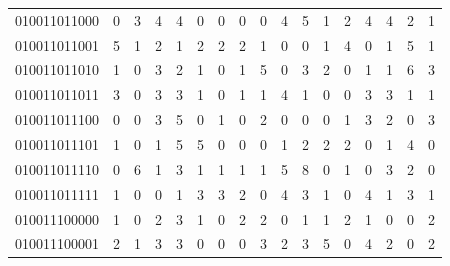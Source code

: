 \documentclass[10pt,a4paper]{article}
\begin{document}
\begin{longtable}{ |c|c|c|c|c|c|c|c|c|c|c|c|c|c|c|c|c| }
    010011011000              & 0                            & 3                                & 4                            & 4                              & 0   & 0   & 0   & 0   & 4   & 5   & 1   & 2   & 4   & 4   & 2   & 1   \\
    010011011001              & 5                            & 1                                & 2                            & 1                              & 2   & 2   & 2   & 1   & 0   & 0   & 1   & 4   & 0   & 1   & 5   & 1   \\
    010011011010              & 1                            & 0                                & 3                            & 2                              & 1   & 0   & 1   & 5   & 0   & 3   & 2   & 0   & 1   & 1   & 6   & 3   \\
    010011011011              & 3                            & 0                                & 3                            & 3                              & 1   & 0   & 1   & 1   & 4   & 1   & 0   & 0   & 3   & 3   & 1   & 1   \\
    010011011100              & 0                            & 0                                & 3                            & 5                              & 0   & 1   & 0   & 2   & 0   & 0   & 0   & 1   & 3   & 2   & 0   & 3   \\
    010011011101              & 1                            & 0                                & 1                            & 5                              & 5   & 0   & 0   & 0   & 1   & 2   & 2   & 2   & 0   & 1   & 4   & 0   \\
    010011011110              & 0                            & 6                                & 1                            & 3                              & 1   & 1   & 1   & 1   & 5   & 8   & 0   & 1   & 0   & 3   & 2   & 0   \\
    010011011111              & 1                            & 0                                & 0                            & 1                              & 3   & 3   & 2   & 0   & 4   & 3   & 1   & 0   & 4   & 1   & 3   & 1   \\
    010011100000              & 1                            & 0                                & 2                            & 3                              & 1   & 0   & 2   & 2   & 0   & 1   & 1   & 2   & 1   & 0   & 0   & 2   \\
    010011100001              & 2                            & 1                                & 3                            & 3                              & 0   & 0   & 0   & 3   & 2   & 3   & 5   & 0   & 4   & 2   & 0   & 2   \\

\end{longtable}
\end{document}

